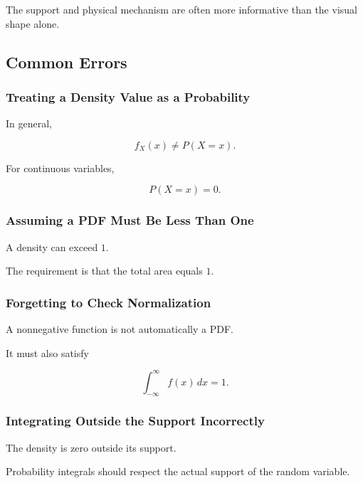 The support and physical mechanism are often more informative than the
visual shape alone.

\subsection{Common Errors}
\label{subsec:continuous-distributions-common-errors}

\subsubsection{Treating a Density Value as a Probability}

In general,

\[
\boxed{
f_X(x)\neq P(X=x).
}
\]

For continuous variables,

\[
P(X=x)=0.
\]

\subsubsection{Assuming a PDF Must Be Less Than One}

A density can exceed \(1\).

The requirement is that the total area equals \(1\).

\subsubsection{Forgetting to Check Normalization}

A nonnegative function is not automatically a PDF.

It must also satisfy

\[
\int_{-\infty}^{\infty}f(x)\,dx=1.
\]

\subsubsection{Integrating Outside the Support Incorrectly}

The density is zero outside its support.

Probability integrals should respect the actual support of the random
variable.

